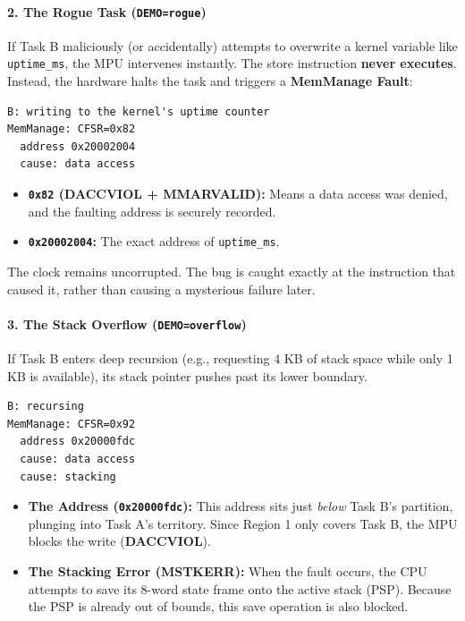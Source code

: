 \paragraph*{2. The Rogue Task (\texttt{DEMO=rogue})}
If Task B maliciously (or accidentally) attempts to overwrite a kernel variable like \texttt{uptime\_ms}, the MPU intervenes instantly. The store instruction \textbf{never executes}. Instead, the hardware halts the task and triggers a \textbf{MemManage Fault}:

\begin{lstlisting}
B: writing to the kernel's uptime counter
MemManage: CFSR=0x82
  address 0x20002004
  cause: data access
\end{lstlisting}

\begin{itemize}
    \item \textbf{\texttt{0x82} (DACCVIOL + MMARVALID):} Means a data access was denied, and the faulting address is securely recorded.
    \item \textbf{\texttt{0x20002004}:} The exact address of \texttt{uptime\_ms}.
\end{itemize}
The clock remains uncorrupted. The bug is caught exactly at the instruction that caused it, rather than causing a mysterious failure later.

\paragraph*{3. The Stack Overflow (\texttt{DEMO=overflow})}
If Task B enters deep recursion (e.g., requesting 4 KB of stack space while only 1 KB is available), its stack pointer pushes past its lower boundary.

\begin{lstlisting}
B: recursing
MemManage: CFSR=0x92
  address 0x20000fdc
  cause: data access
  cause: stacking
\end{lstlisting}

\begin{itemize}
    \item \textbf{The Address (\texttt{0x20000fdc}):} This address sits just \emph{below} Task B's partition, plunging into Task A's territory. Since Region 1 only covers Task B, the MPU blocks the write (\textbf{DACCVIOL}).
    \item \textbf{The Stacking Error (\textbf{MSTKERR}):} When the fault occurs, the CPU attempts to save its 8-word state frame onto the active stack (PSP). Because the PSP is already out of bounds, this save operation is also blocked. 
\end{itemize}

